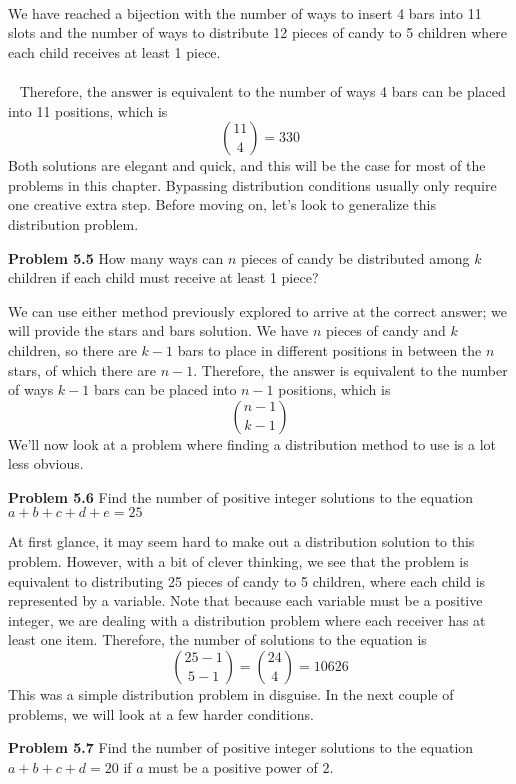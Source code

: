 \documentclass[11pt]{scrartcl}
\begin{document}
\\
\noindent 
We have reached a bijection with the number of ways to insert 4 bars into 11 slots and the number of ways to distribute 12 pieces of candy to 5 children where each child receives at least 1 piece. \\
\\\
\noindent
Therefore, the answer is equivalent to the number of ways 4 bars can be placed into 11 positions, which is 
$${{11 \choose 4}}=330$$
\noindent 
Both solutions are elegant and quick, and this will be the case for most of the problems in this chapter. Bypassing distribution conditions usually only require one creative extra step. Before moving on, let's look to generalize this distribution problem. 
\\
\begin{tcolorbox}
\textbf{Problem 5.5} How many ways can $n$ pieces of candy be distributed among $k$ children if each child must receive at least 1 piece?
\end{tcolorbox}
\noindent 
We can use either method previously explored to arrive at the correct answer; we will provide the stars and bars solution. We have $n$ pieces of candy and $k$ children, so there are $k-1$ bars to place in different positions in between the $n$ stars, of which there are $n-1$. Therefore, the answer is equivalent to the number of ways $k-1$ bars can be placed into $n-1$ positions, which is
$${{n-1} \choose {k-1}}$$
\noindent 
We'll now look at a problem where finding a distribution method to use is a lot less obvious. 
\\
\begin{tcolorbox}
\textbf{Problem 5.6} Find the number of positive integer solutions to the equation $a+b+c+d+e=25$
\end{tcolorbox}
\noindent
At first glance, it may seem hard to make out a distribution solution to this problem. However, with a bit of clever thinking, we see that the problem is equivalent to distributing 25 pieces of candy to 5 children, where each child is represented by a variable. Note that because each variable must be a positive integer, we are dealing with a distribution problem where each receiver has at least one item. Therefore, the number of solutions to the equation is
$${{25-1} \choose {5-1}}={24 \choose 4}=10626$$
\noindent 
This was a simple distribution problem in disguise. In the next couple of problems, we will look at a few harder conditions. 
\\
\begin{tcolorbox}
\textbf{Problem 5.7} Find the number of positive integer solutions to the equation $a+b+c+d=20$ if $a$ must be a positive power of $2$. 
\end{tcolorbox}
\end{document}
